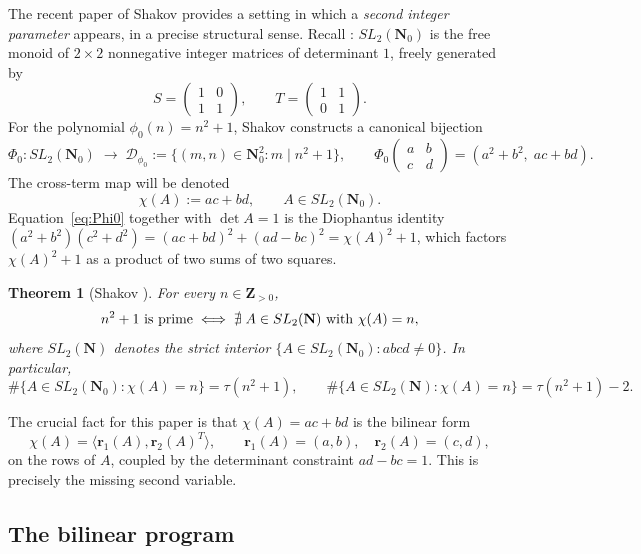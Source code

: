 \documentclass[11pt]{article}
\newtheorem{theorem}{Theorem}[section]
\theoremstyle{definition}
\newcommand{\N}{\mathbf{N}}
\newcommand{\Nz}{\mathbf{N}_0}
\newcommand{\Z}{\mathbf{Z}}
\newcommand{\SLNz}{SL_2(\Nz)}
\newcommand{\SLN}{SL_2(\N)}
\newcommand{\Dphi}{\mathcal{D}_{\phi_0}}
\begin{document}
The recent paper of Shakov \cite{shakov} provides a setting in which a
\emph{second integer parameter} appears, in a precise structural sense.
Recall \cite[\S 1--2]{shakov}: $\SLNz$ is the free monoid of $2\times 2$
nonnegative integer matrices of determinant $1$, freely generated by
\[
S=\begin{pmatrix}1 & 0\\ 1 & 1\end{pmatrix},\qquad
T=\begin{pmatrix}1 & 1\\ 0 & 1\end{pmatrix}.
\]
For the polynomial $\phi_{0}(n)=n^{2}+1$, Shakov constructs a
canonical bijection
\begin{equation}\label{eq:Phi0}
\Phi_{0}\colon\SLNz\;\longrightarrow\;\Dphi
:=\{(m,n)\in\Nz^{2}:m\mid n^{2}+1\},\qquad
\Phi_{0}\!\begin{pmatrix}a & b\\ c & d\end{pmatrix}=(a^{2}+b^{2},\;ac+bd).
\end{equation}
The cross-term map will be denoted
\[
\chi(A):=ac+bd,\qquad A\in\SLNz.
\]
Equation~\eqref{eq:Phi0} together with $\det A=1$ is the Diophantus
identity
$(a^{2}+b^{2})(c^{2}+d^{2})=(ac+bd)^{2}+(ad-bc)^{2}=\chi(A)^{2}+1$,
which factors $\chi(A)^{2}+1$ as a product of two sums of two squares.

\begin{theorem}[Shakov ]
\label{thm:shakov-prime-char}
For every $n\in\Z_{>0}$,
\[
n^{2}+1\textnormal{ is prime}\iff
\nexists\;A\in\SLN\textnormal{ with }\chi(A)=n,
\]
where $\SLN$ denotes the strict interior $\{A\in\SLNz:abcd\ne 0\}$. In
particular,
\[
\#\{A\in\SLNz:\chi(A)=n\}=\tau(n^{2}+1),\qquad
\#\{A\in\SLN:\chi(A)=n\}=\tau(n^{2}+1)-2.
\]
\end{theorem}

The crucial fact for this paper is that $\chi(A)=ac+bd$ is the bilinear
form
\begin{equation}\label{eq:bilinear-chi}
\chi(A)=\langle\mathbf{r}_{1}(A),\mathbf{r}_{2}(A)^{T}\rangle,\qquad
\mathbf{r}_{1}(A)=(a,b),\quad\mathbf{r}_{2}(A)=(c,d),
\end{equation}
on the rows of $A$, coupled by the determinant constraint $ad-bc=1$.
This is precisely the missing second variable.

\subsection{The bilinear program}
\end{document}
